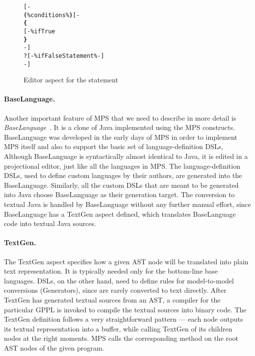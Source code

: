 \begin{figure}[ht]
\centering
\begin{alltt}
\small
{}  
    [-
       \textbf{(} \% conditions \% \textbf{)} [-
      \textbf{\{}
      [- \% ifTrue % -]
      \textbf{\}}
    -]
    ?[-  \% ifFalseStatement \% -]
    -]
\end{alltt}
\caption{Editor aspect for the  statement}
\label{fig:if_editor_definition}
\end{figure}

\paragraph{BaseLanguage.}
Another important feature of MPS that we need to describe in more detail is \emph{BaseLanguage}~\cite{ref:BASELANG}.
It is a clone of Java implemented using the MPS constructs.
BaseLanguage was developed in the early days of MPS in order to implement MPS itself and also to support the basic set of language-definition DSLs,
Although BaseLanguage is syntactically almost identical to Java, it is edited in a projectional editor, just like all the languages in MPS.
The language-definition DSLs, used to define custom languages by their authors, are generated into the BaseLanguage.
Similarly, all the custom DSLs that are meant to be generated into Java choose BaseLanguage as their generation target.
The conversion to textual Java is handled by BaseLanguage without any further manual effort, since BaseLanguage has a TextGen aspect defined, which translates BaseLanguage code into textual Java sources.

\paragraph{TextGen.}
The TextGen aspect specifies how a given AST node will be translated into plain text representation.
It is typically needed only for the bottom-line base languages.
DSLs, on the other hand, need to define rules for model-to-model conversions (Generators), since  are rarely converted to text directly.
After TextGen has generated textual sources from an AST, a compiler for the particular GPPL is invoked to compile the textual sources into binary code.
The TextGen definition follows a very straightforward pattern --- each node outputs its textual representation into a buffer, while calling TextGen of its children nodes at the right moments.
MPS calls the corresponding method on the root AST nodes of the given program.

